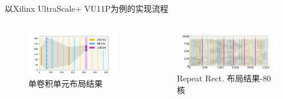 \documentclass[10pt]{beamer}
\begin{document}
\begin{frame}{以Xilinx UltraScale+ VU11P为例的实现流程}

  \begin{columns}[T, onlytextwidth]

    \vspace{-0.5cm}
    \begin{figure}
      \includegraphics[width=\textwidth]{img/block1}
      \caption{单卷积单元布局结果}
    \end{figure}
    \vspace{-1cm}
    \begin{figure}
      \includegraphics[width=\textwidth]{img/block80}
      \caption{Repeat Rect. 布局结果-80核}
      \label{fig:block80}
    \end{figure}


\end{columns}
\end{frame}
\end{document}
